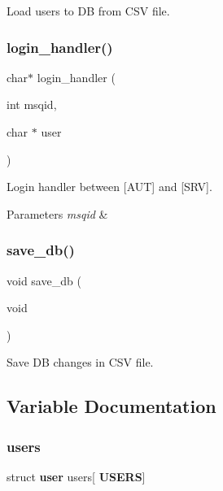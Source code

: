 Load users to DB from C\+SV file. 

\mbox{\label{auth_8h_a7a9845bb1a55c99afdd16add9b4b3808}} 
\subsubsection{login\+\_\+handler()}
{\footnotesize\ttfamily char$\ast$ login\+\_\+handler (\begin{DoxyParamCaption}\item[{int}]{msqid,  }\item[{char $\ast$}]{user }\end{DoxyParamCaption})}



Login handler between [A\+UT] and [S\+RV]. 


\begin{DoxyParams}{Parameters}
{\em msqid} & \\
\hline
\end{DoxyParams}
\mbox{\label{auth_8h_a7145eb48ec5e46fbb39b0b174a026cd1}} 
\subsubsection{save\+\_\+db()}
{\footnotesize\ttfamily void save\+\_\+db (\begin{DoxyParamCaption}\item[{void}]{ }\end{DoxyParamCaption})}



Save DB changes in C\+SV file. 



\subsection{Variable Documentation}
\mbox{\label{auth_8h_ad1b6438b2448da2b01d9887f58f5fb66}} 
\subsubsection{users}
{\footnotesize\ttfamily struct \textbf{ user} users[\textbf{ U\+S\+E\+RS}]}

